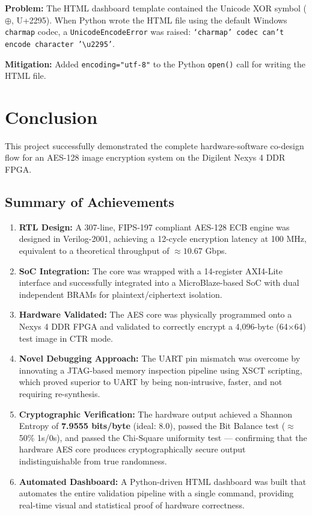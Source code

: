 \documentclass[12pt,a4paper]{article}
\begin{document}
\textbf{Problem:} The HTML dashboard template contained the Unicode XOR symbol ($\oplus$, U+2295). When Python wrote the HTML file using the default Windows \texttt{charmap} codec, a \texttt{UnicodeEncodeError} was raised: \texttt{`charmap' codec can't encode character '\textbackslash u2295'}.

\textbf{Mitigation:} Added \texttt{encoding="utf-8"} to the Python \texttt{open()} call for writing the HTML file.

\section{Conclusion}

This project successfully demonstrated the complete hardware-software co-design flow for an AES-128 image encryption system on the Digilent Nexys 4 DDR FPGA.

\subsection{Summary of Achievements}

\begin{enumerate}[leftmargin=*]
    \item \textbf{RTL Design:} A 307-line, FIPS-197 compliant AES-128 ECB engine was designed in Verilog-2001, achieving a 12-cycle encryption latency at 100 MHz, equivalent to a theoretical throughput of $\approx 10.67$ Gbps.
    
    \item \textbf{SoC Integration:} The core was wrapped with a 14-register AXI4-Lite interface and successfully integrated into a MicroBlaze-based SoC with dual independent BRAMs for plaintext/ciphertext isolation.
    
    \item \textbf{Hardware Validated:} The AES core was physically programmed onto a Nexys 4 DDR FPGA and validated to correctly encrypt a 4,096-byte (64$\times$64) test image in CTR mode.
    
    \item \textbf{Novel Debugging Approach:} The UART pin mismatch was overcome by innovating a JTAG-based memory inspection pipeline using XSCT scripting, which proved superior to UART by being non-intrusive, faster, and not requiring re-synthesis.
    
    \item \textbf{Cryptographic Verification:} The hardware output achieved a Shannon Entropy of \textbf{7.9555 bits/byte} (ideal: 8.0), passed the Bit Balance test ($\approx$50\% 1s/0s), and passed the Chi-Square uniformity test --- confirming that the hardware AES core produces cryptographically secure output indistinguishable from true randomness.
    
    \item \textbf{Automated Dashboard:} A Python-driven HTML dashboard was built that automates the entire validation pipeline with a single command, providing real-time visual and statistical proof of hardware correctness.
\end{enumerate}
\end{document}
